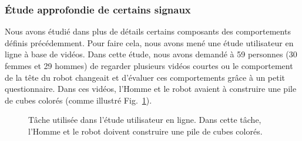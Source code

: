 \documentclass[english,a4paper,11pt,twoside]{StyleThese}
\begin{document}
\subsubsection{Étude approfondie de certains signaux }

Nous avons étudié dans plus de détails certains composants des comportements définis précédemment. Pour faire cela, nous avons mené une étude utilisateur en ligne à base de vidéos. Dans cette étude, nous avons demandé à 59 personnes (30 femmes et 29 hommes) de regarder plusieurs vidéos courtes ou le comportement de la tête du robot changeait et d'évaluer ces comportements grâce à un petit questionnaire. Dans ces vidéos, l'Homme et le robot avaient à construire une pile de cubes colorés (comme illustré Fig.~\ref{fig:videoTask}).

\begin{figure}[!t]
\centering
	\hfill
    \caption{Tâche utilisée dans l'étude utilisateur en ligne. Dans cette tâche, l'Homme et le robot doivent construire une pile de cubes colorés.}
    \label{fig:videoTask}
\end{figure}
\end{document}
